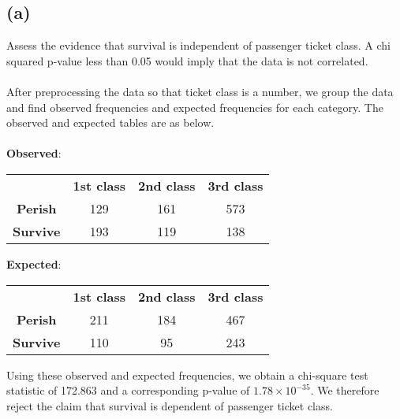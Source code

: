 \documentclass[11pt]{article}
\begin{document}
\subsection*{(a)}
Assess the evidence that survival is independent of passenger ticket class. A chi squared p-value less than 0.05 would imply that the data is not correlated.\\ \\
After preprocessing the data so that ticket class is a number, we group the data and find observed frequencies and expected frequencies for each category. The observed and expected tables are as below. \\ \\
\textbf{Observed}:
\begin{center}
\begin{tabular}{ c c c c }
& \textbf{1st class} & \textbf{2nd class} & \textbf{3rd class} \\
\textbf{Perish} & 129 & 161 & 573 \\
\textbf{Survive} & 193 & 119 & 138
\end{tabular}
\end{center}
\textbf{Expected}:
\begin{center}
\begin{tabular}{ c c c c }
& \textbf{1st class} & \textbf{2nd class} & \textbf{3rd class} \\
\textbf{Perish} & 211 & 184 & 467 \\
\textbf{Survive} & 110 & 95 & 243
\end{tabular}
\end{center}
Using these observed and expected frequencies, we obtain a chi-square test statistic of 172.863 and a corresponding p-value of $1.78\times10^{-35}$. We therefore reject the claim that survival is dependent of passenger ticket class.
\end{document}
